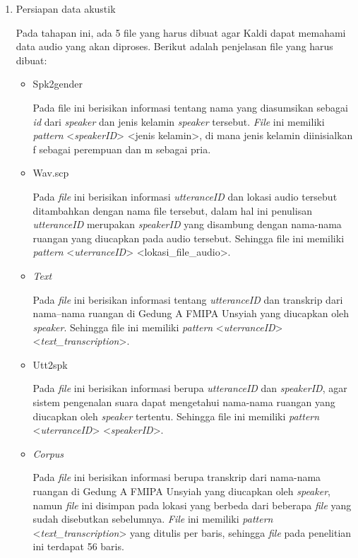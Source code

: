 \begin{enumerate}
\item Persiapan data akustik
\par Pada tahapan ini, ada 5 file yang harus dibuat agar Kaldi dapat memahami data audio yang akan diproses. Berikut adalah penjelasan file yang harus dibuat:
	\begin{itemize}
	\item Spk2gender
	\par Pada file ini berisikan informasi tentang nama yang diasumsikan sebagai \textit{id} dari \textit{speaker} dan jenis kelamin \textit{speaker} tersebut. \textit{File} ini memiliki \textit{pattern} <\textit{speakerID}> <jenis kelamin>, di mana jenis kelamin diinisialkan f sebagai perempuan dan m sebagai pria.
	
	\item Wav.scp
	\par Pada \textit{file} ini berisikan informasi \textit{utteranceID} dan lokasi audio tersebut ditambahkan dengan nama file tersebut, dalam hal ini penulisan \textit{utteranceID} merupakan \textit{speakerID} yang disambung dengan nama-nama ruangan yang diucapkan pada audio tersebut. Sehingga file ini memiliki \textit{pattern} <\textit{uterranceID}> <lokasi\_file\_audio>.	
	
	\item \textit{Text}
	\par Pada \textit{file} ini berisikan informasi tentang \textit{utteranceID} dan transkrip dari nama--nama ruangan di Gedung A FMIPA Unsyiah yang diucapkan oleh \textit{speaker}. Sehingga file ini memiliki \textit{pattern} <\textit{uterranceID}> <\textit{text\_transcription}>.
	
	\item Utt2spk
	\par Pada \textit{file} ini berisikan informasi berupa \textit{utteranceID} dan \textit{speakerID}, agar sistem pengenalan suara dapat mengetahui nama-nama ruangan yang diucapkan oleh \textit{speaker} tertentu. Sehingga file ini memiliki \textit{pattern} <\textit{uterranceID}> <\textit{speakerID}>.
	
	\item \textit{Corpus}
	\par Pada \textit{file} ini berisikan informasi berupa transkrip dari nama-nama ruangan di Gedung A FMIPA Unsyiah yang diucapkan oleh \textit{speaker}, namun \textit{file} ini disimpan pada lokasi yang berbeda dari beberapa \textit{file} yang sudah disebutkan sebelumnya. \textit{File} ini memiliki \textit{pattern} <\textit{text\_transcription}> yang ditulis per baris, sehingga \textit{file} pada penelitian ini terdapat 56 baris.
	\end{itemize}


\end{enumerate}
